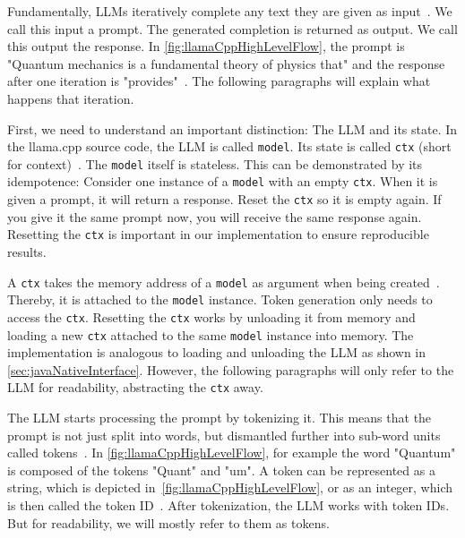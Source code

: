 Fundamentally, \glspl{LLM} iteratively complete any text they are given as input~\cite{mallisUnderstandingHowLLM2023}. We call this input a prompt. The generated completion is returned as output. We call this output the response. In \cref{fig:llamaCppHighLevelFlow}, the prompt is "Quantum mechanics is a fundamental theory of physics that" and the response after one iteration is "provides"~\cite{mallisUnderstandingHowLLM2023}. The following paragraphs will explain what happens that iteration.

First, we need to understand an important distinction: The \gls{LLM} and its state. In the llama.cpp source code, the \gls{LLM} is called \lstinline|model|. Its state is called \lstinline|ctx| (short for context)~\cite{gerganovGgerganovLlamacpp2024}. The \lstinline|model| itself is stateless. This can be demonstrated by its idempotence: Consider one instance of a \lstinline|model| with an empty \lstinline|ctx|. When it is given a prompt, it will return a response. Reset the \lstinline|ctx| so it is empty again. If you give it the same prompt now, you will receive the same response again. Resetting the \lstinline|ctx| is important in our implementation to ensure reproducible results.

A \lstinline|ctx| takes the memory address of a \lstinline|model| as argument when being created~\cite{gerganovGgerganovLlamacpp2024}. Thereby, it is attached to the \lstinline|model| instance. Token generation only needs to access the \lstinline|ctx|. Resetting the \lstinline|ctx| works by unloading it from memory and loading a new \lstinline|ctx| attached to the same \lstinline|model| instance into memory. The implementation is analogous to loading and unloading the \gls{LLM} as shown in \cref{sec:javaNativeInterface}. However, the following paragraphs will only refer to the \gls{LLM} for readability, abstracting the \lstinline|ctx| away.

The \gls{LLM} starts processing the prompt by tokenizing it. This means that the prompt is not just split into words, but dismantled further into sub-word units called tokens~\cite{mallisUnderstandingHowLLM2023}. In \cref{fig:llamaCppHighLevelFlow}, for example the word "Quantum" is composed of the tokens "Quant" and "um". A token can be represented as a string, which is depicted in~\cref{fig:llamaCppHighLevelFlow}, or as an integer, which is then called the token ID~\cite{mallisUnderstandingHowLLM2023}. After tokenization, the \gls{LLM} works with token IDs. But for readability, we will mostly refer to them as tokens.

